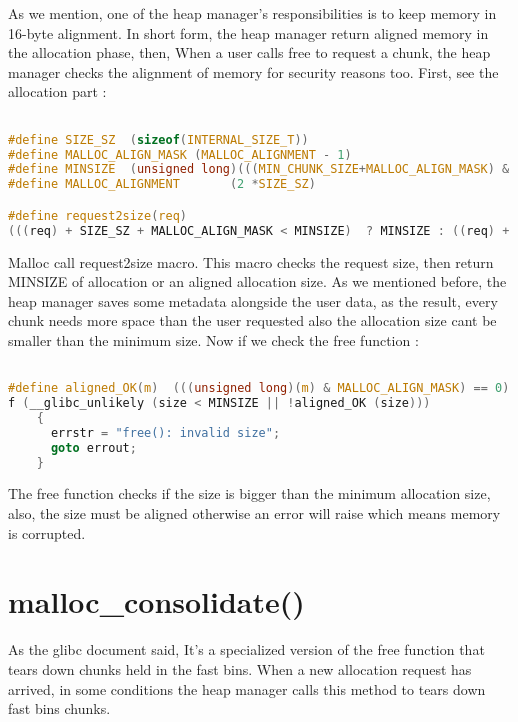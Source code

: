 \documentclass{masterthesis}
\newcommand*\libc{glibc}
\newcommand*\fb{fast bins}
\begin{document}
As we mention, one of the heap manager's responsibilities is to keep memory in 16-byte alignment. In short form, the heap manager return aligned memory in the allocation phase, then, When a user calls free to request a chunk, the heap manager checks the alignment of memory for security reasons too. First, see the allocation part :
\begin{lstlisting}[language=c]

#define SIZE_SZ  (sizeof(INTERNAL_SIZE_T))
#define MALLOC_ALIGN_MASK (MALLOC_ALIGNMENT - 1)
#define MINSIZE  (unsigned long)(((MIN_CHUNK_SIZE+MALLOC_ALIGN_MASK) & ~MALLOC_ALIGN_MASK))
#define MALLOC_ALIGNMENT       (2 *SIZE_SZ)

#define request2size(req)
(((req) + SIZE_SZ + MALLOC_ALIGN_MASK < MINSIZE)  ? MINSIZE : ((req) + SIZE_SZ + MALLOC_ALIGN_MASK) & ~MALLOC_ALIGN_MASK)
\end{lstlisting}
Malloc call request2size macro. This macro checks the request size, then return MINSIZE of allocation or an aligned allocation size. As we mentioned before, the heap manager saves some metadata alongside the user data, as the result, every chunk needs more space than the user requested also the allocation size cant be smaller than the minimum size. Now if we check the free function :

\begin{lstlisting}[language=c]

#define aligned_OK(m)  (((unsigned long)(m) & MALLOC_ALIGN_MASK) == 0)
f (__glibc_unlikely (size < MINSIZE || !aligned_OK (size)))
    {
      errstr = "free(): invalid size";
      goto errout;
    }
\end{lstlisting}
The free function checks if the size is bigger than the minimum allocation size, also, the size must be aligned otherwise an error will raise which means memory is corrupted.
\section{malloc\_consolidate()}
As the \libc{} document said, It's a specialized version of the free function that tears down chunks held in the \fb{}. When a new allocation request has arrived, in some conditions the heap manager calls this method to tears down \fb{} chunks. 
\end{document}
